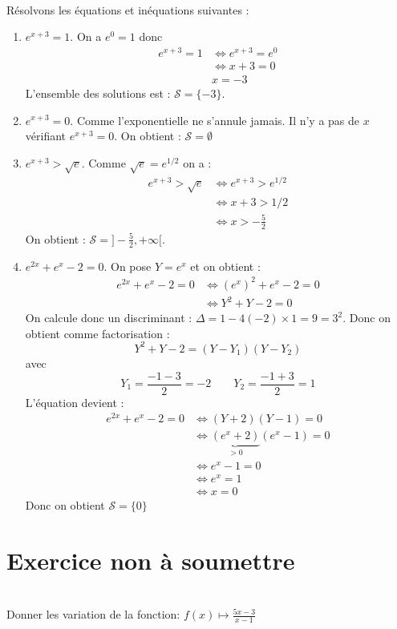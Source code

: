 \documentclass[12pt,fleqn]{report} %
\begin{document}
\begin{example}\text{ }\\
	Résolvons les équations et inéquations suivantes : 
	\begin{enumerate}
		\item $e^{x + 3} = 1$.
		On a $e^0 = 1$ donc
		\begin{align*}
		e^{x+3} = 1   & \Leftrightarrow  e^{x+3} = e^0 \\
		& \Leftrightarrow x+3 = 0 \\
		& x = -3
		\end{align*}
		L'ensemble des solutions est : $\mathcal{S} =\lbrace -3 \rbrace$.
		\item $e^{x + 3} = 0$. Comme l'exponentielle ne s'annule jamais. Il n'y a pas de $x$ vérifiant $e^{x+3} = 0$. On obtient : $\mathcal{S} = \emptyset$
		\item $e^{x + 3} > \sqrt{e}$. Comme $\sqrt{e} = e^{1/2}$ on a :
		\begin{align*}
		e^{x+3} > \sqrt{e}  & \Leftrightarrow e^{x+3} > e^{1/2} \\ 
		& \Leftrightarrow x+3 > 1/2 \\
		& \Leftrightarrow x > -\frac{5}{2}
		\end{align*}
		On obtient : $\mathcal{S} = ]-\frac{5}{2}, +\infty [$.
		\item $e^{2x} + e^x - 2 = 0$. On pose $Y = e^x$ et on obtient : 
		\begin{align*}
		e^{2x} + e^x - 2 = 0 & \iff \left(e^x\right)^2 + e^x - 2 = 0 \\
		& \iff Y^2 + Y - 2 = 0 
		\end{align*} 
		On calcule donc un discriminant : $\Delta = 1 - 4(-2)\times1 = 9 = 3^2$. Donc on obtient comme factorisation : \[
		Y^2 + Y - 2 = (Y - Y_1)(Y - Y_2)
		\]
		avec \[
		Y_1 = \frac{-1 - 3}{2} = -2 \qquad Y_2 = \frac{- 1 + 3}{2} = 1
		\]
		L'équation devient : 
		\begin{align*}
		e^{2x} + e^x - 2 = 0 & \iff (Y + 2)(Y- 1) = 0 \\
		& \iff \underbrace{(e^x + 2)}_{>0}(e^x - 1) = 0 \\
		& \iff e^x - 1 = 0 \\
		& \iff e^x = 1 \\
		& \iff x = 0
		\end{align*}
		Donc on obtient $\mathcal{S} = \lbrace 0 \rbrace$
	\end{enumerate}
\end{example}

\chapter*{Exercice non à soumettre}
\begin{exercise}\label{Exercice 4}\text{ }\\
	Donner les variation de la fonction: $f(x) \mapsto \frac{5x-3}{x-1}$
\end{exercise}
\end{document}
